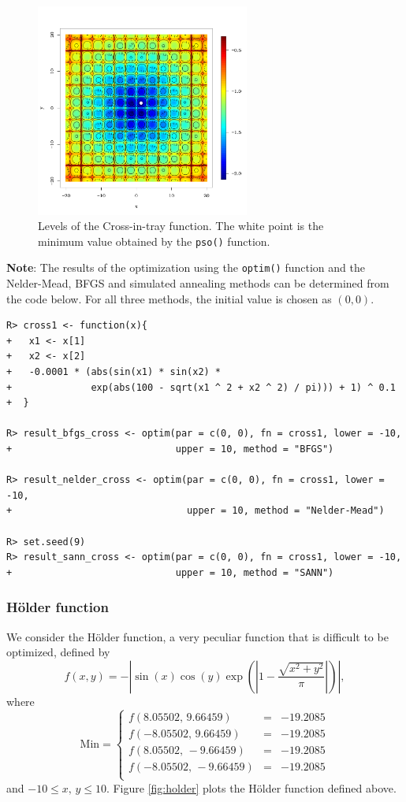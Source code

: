 \documentclass[10pt,letterpaper]{article}
\begin{document}
\begin{figure}[H]
\centering
\includegraphics[width=7cm,height=7cm]{curve_cross}
\caption{Levels of the Cross-in-tray function.
The white point is the minimum value obtained by the \texttt{pso()} function.}
\label{curves_cross}
\end{figure}

\noindent
\textbf{Note}: The results of the optimization using the \texttt{optim()} function and the Nelder-Mead, BFGS and simulated annealing
methods can be determined from the code below.
For all three  methods, the initial value is chosen as $(0, 0)$.
\begin{verbatim}
R> cross1 <- function(x){
+   x1 <- x[1]
+   x2 <- x[2]
+   -0.0001 * (abs(sin(x1) * sin(x2) *
+              exp(abs(100 - sqrt(x1 ^ 2 + x2 ^ 2) / pi))) + 1) ^ 0.1
+  }

R> result_bfgs_cross <- optim(par = c(0, 0), fn = cross1, lower = -10,
+                             upper = 10, method = "BFGS")

R> result_nelder_cross <- optim(par = c(0, 0), fn = cross1, lower = -10,
+                               upper = 10, method = "Nelder-Mead")

R> set.seed(9)
R> result_sann_cross <- optim(par = c(0, 0), fn = cross1, lower = -10,
+                             upper = 10, method = "SANN")
\end{verbatim}

\subsubsection{H\"{o}lder function}

We consider the H\"{o}lder function, a very peculiar function that is difficult to be optimized, defined by
$$f(x,y) = - \left| \sin(x) \cos(y) \exp \left( \left| 1 - \frac{\sqrt{x^2 + y^2}}{\pi}  \right|  \right)   \right|,$$
where
$$
\mathrm{Min} = \left\{
\begin{array}{ccc}
f(8.05502,\, 9.66459) & = & -19.2085
\\
f(-8.05502,\, 9.66459) & = & -19.2085
\\
f(8.05502,\, -9.66459) & = & -19.2085
\\
f(-8.05502,\,-9.66459) & = & -19.2085
\\
\end{array}
\right.
$$
and $-10 \leq x,\, y \leq 10$.
Figure \ref{fig:holder}  plots the H\"{o}lder function defined above.
\end{document}
